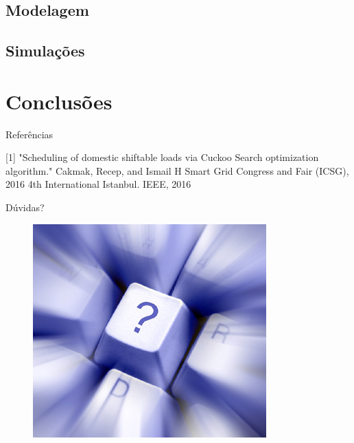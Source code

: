 \documentclass{beamer}
\begin{document}
\subsection{Modelagem}
\frame{\tableofcontents[currentsection]}


\subsection{Simulações}
\frame{\tableofcontents[currentsection]}


\section{Conclusões}
\frame{\tableofcontents[currentsection]}



\begin{frame}[allowframebreaks]{Referências}
% 

\begin{thebibliography}{10}
		[1]
			"Scheduling of domestic shiftable loads via Cuckoo Search optimization
      algorithm."
      \newblock Cakmak, Recep, and Ismail H
      \newblock Smart Grid Congress and Fair (ICSG), 2016 4th International
      Istanbul. IEEE, 2016
\end{thebibliography}
\end{frame}

\begin{frame}{Dúvidas?}
  \begin{figure}[h]
  	\begin{center}
      \includegraphics [scale=0.4]{./Figures/duvida}
  	\end{center}
  \end{figure}
\end{frame}
\end{document}
